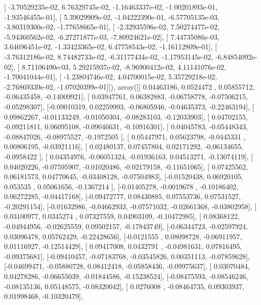\documentclass{article}
\begin{document}
       [ -3.70529235e-02,   6.76329745e-02,  -1.16463337e-02,
         -1.00201893e-01,  -1.93546455e-01],
       [  5.39029909e-02,  -1.04222390e-01,  -6.57705135e-03,
         -3.80319300e-02,  -1.77658665e-01],
       [ -2.32935596e-02,   7.50274477e-02,  -5.94360562e-02,
         -6.27271877e-03,  -7.80924621e-02],
       [  7.44735086e-03,   3.64696451e-02,  -1.33423365e-02,
          6.47758543e-02,  -1.16112809e-01],
       [ -3.76312186e-02,   8.74482733e-02,  -6.31177434e-02,
         -1.17953145e-02,  -6.84854092e-02],
       [  8.71106490e-03,   5.29215937e-02,  -8.96900412e-02,
          4.11141076e-02,  -1.70041044e-01],
       [ -1.23804746e-02,   4.04700015e-02,   5.35729218e-02,
         -2.76869339e-02,  -1.07020399e-01]]), array([[ 0.04463186,  0.0524472 ,  0.05855712, -0.06435458, -0.14009921],
       [ 0.03947761,  0.06382883, -0.06758778, -0.07506215, -0.05298307],
       [-0.09010319,  0.02259993, -0.06805946, -0.04635373, -0.22463194],
       [ 0.09862267, -0.01133249, -0.01050304, -0.08283103, -0.12033903],
       [ 0.04702155, -0.09211811,  0.06095108, -0.09046631, -0.10916301],
       [ 0.04045783, -0.05448343, -0.08847026, -0.08975527, -0.1972505 ],
       [ 0.05447971,  0.05623798, -0.0445331 ,  0.00806195, -0.03921116],
       [ 0.02480137,  0.07457804,  0.02171292, -0.06134655, -0.0958422 ],
       [ 0.04354976, -0.06051324, -0.01936163,  0.04513271, -0.13074119],
       [ 0.04020226, -0.07595907, -0.01020486, -0.02179158, -0.11651065],
       [ 0.07425562,  0.06181573,  0.04770645, -0.03408128, -0.07504983],
       [-0.01520438,  0.06920105,  0.053535  ,  0.05061656, -0.1367214 ],
       [-0.01405278, -0.0019678 , -0.10186402,  0.06272285, -0.04417168],
       [-0.09472777,  0.08430885,  0.07553736,  0.07531527, -0.20291154],
       [-0.01632986, -0.04662933, -0.07571032, -0.02661368, -0.03802958],
       [ 0.03100977,  0.0345274 ,  0.07327559,  0.04903109, -0.10472985],
       [ 0.08368122, -0.04944956, -0.02625559,  0.09502157, -0.17843749],
       [-0.06344723, -0.02597924,  0.03096478,  0.05762429, -0.22428656],
       [-0.0121555 ,  0.08098728, -0.06911957,  0.01116927, -0.12514429],
       [ 0.09417008,  0.0432791 , -0.04981631,  0.07816495, -0.09375681],
       [-0.09410457, -0.07183768, -0.03545826,  0.00351113, -0.07859628],
       [-0.04699471, -0.05880728,  0.08412418, -0.05858436, -0.09975637],
       [ 0.03070484,  0.04278286, -0.06655039, -0.01844586, -0.15238524],
       [-0.08475593, -0.08546246, -0.08135136,  0.05148575, -0.08320042],
       [ 0.0276008 , -0.08464735,  0.09303937,  0.01998468, -0.10320479],
\end{document}
